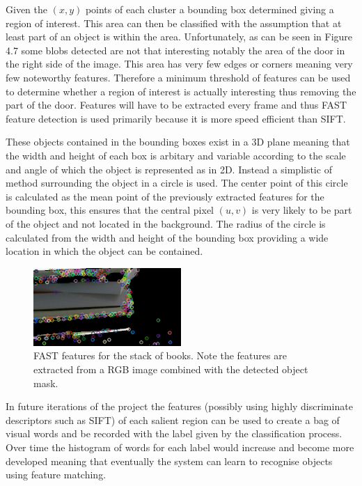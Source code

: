 \documentclass{mproj}
\begin{document}
Given the $(x, y)$ points of each cluster a bounding box determined giving a region of interest. This area can then be classified with the assumption that at least part of an object is within the area. Unfortunately, as can be seen in Figure 4.7 some blobs detected are not that interesting notably the area of the door in the right side of the image. This area has very few edges or corners meaning very few noteworthy features. Therefore a minimum threshold of features can be used to determine whether a region of interest is actually interesting thus removing the part of the door. Features will have to be extracted every frame and thus FAST feature detection is used primarily because it is more speed efficient than SIFT.

These objects contained in the bounding boxes exist in a 3D plane meaning that the width and height of each box is arbitary and variable according to the scale and angle of which the object is represented as in 2D. Instead a simplistic of method surrounding the object in a circle is used. The center point of this circle is calculated as the mean point of the previously extracted features for the bounding box, this ensures that the central pixel $(u,v)$ is very likely to be part of the object and not located in the background. The radius of the circle is calculated from the width and height of the bounding box providing a wide location in which the object can be contained.

\begin{figure}
   \caption{FAST features for the stack of books. Note the features are extracted from a RGB image combined with the detected object mask.}
   \centering
   \includegraphics[width=0.5\textwidth]{images/fast.png}
   
\end{figure}

In future iterations of the project the features (possibly using highly discriminate descriptors such as SIFT) of each salient region can be used to create a bag of visual words and be recorded with the label given by the classification process. Over time the histogram of words for each label would increase and become more developed meaning that eventually the system can learn to recognise objects using feature matching. 
\end{document}
